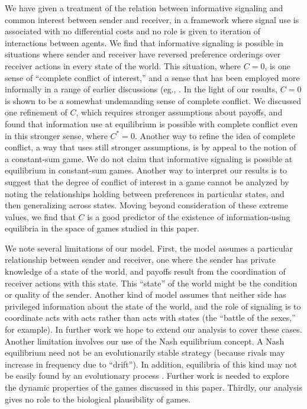 \documentclass[10pt]{article}
\begin{document}
We have given a treatment of the relation between informative signaling
and common interest between sender and receiver, in a framework where
signal use is associated with no differential costs and no role is given
to iteration of interactions between agents. We find that informative
signaling is possible in situations where sender and receiver have
reversed preference orderings over receiver actions in every state of
the world. This situation, where $C=0$, is one sense of ``complete
conflict of interest,'' and a sense that has been employed more
informally in a range of earlier discussions (eg., \cite{Maynard-Smith1994,Searcy2005}. In the light of our results, $C=0$ is shown to
be a somewhat undemanding sense of complete conflict. We discussed one
refinement of $C$, which requires stronger assumptions about payoffs, and
found that information use at equilibrium is possible with complete
conflict even in this stronger sense, where $C^*=0$. Another way to
refine the idea of complete conflict, a way that uses still stronger
assumptions, is by appeal to the notion of a constant-sum game. We do
not claim that informative signaling is possible at equilibrium in
constant-sum games. Another way to interpret our results is to suggest
that the degree of conflict of interest in a game cannot be analyzed by
noting the relationships holding between preferences in particular
states, and then generalizing across states. Moving beyond consideration
of these extreme values, we find that $C$ is a good predictor of
the existence of information-using equilibria in the space of games
studied in this paper.

We note several limitations of our model. First, the model assumes a
particular relationship between sender and receiver, one where the
sender has private knowledge of a state of the world, and payoffs
result from the coordination of receiver actions with this state. This
``state'' of the world might be the condition or quality of the sender.
Another kind of model assumes that neither side has privileged
information about the state of the world, and the role of signaling is
to coordinate acts with acts rather than acts with states (the ``battle
of the sexes,'' for example). In further work we hope to extend our
analysis to cover these cases. Another limitation involves our use of
the Nash equilibrium concept. A Nash equilibrium need not be an
evolutionarily stable strategy (because rivals may increase in frequency
due to ``drift''). In addition, equilibria of this kind may not be
easily found by an evolutionary process \cite{Huttegger2010}. Further
work is needed to explore the dynamic properties of the games discussed
in this paper. Thirdly, our analysis gives no role to the biological
plausibility of games.
\end{document}
